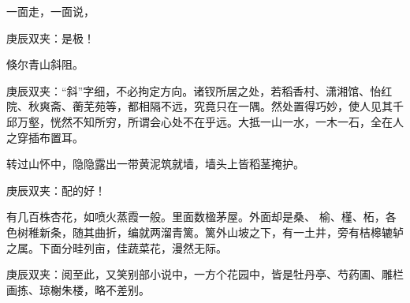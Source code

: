 \begin{parag}
    一面走，一面说，\begin{note}庚辰双夹：是极！\end{note}倏尔青山斜阻。\begin{note}庚辰双夹：“斜”字细，不必拘定方向。诸钗所居之处，若稻香村、潇湘馆、怡红院、秋爽斋、蘅芜苑等，都相隔不远，究竟只在一隅。然处置得巧妙，使人见其千邱万壑，恍然不知所穷，所谓会心处不在乎远。大抵一山一水，一木一石，全在人之穿插布置耳。\end{note}转过山怀中，隐隐露出一带黄泥筑就墙，墙头上皆稻茎掩护。\begin{note}庚辰双夹：配的好！\end{note}有几百株杏花，如喷火蒸霞一般。里面数楹茅屋。外面却是桑、 榆、槿、柘，各色树稚新条，随其曲折，编就两溜青篱。篱外山坡之下，有一土井，旁有桔槔辘轳之属。下面分畦列亩，佳蔬菜花，漫然无际。\begin{note}庚辰双夹：阅至此，又笑别部小说中，一方个花园中，皆是牡丹亭、芍药圃、雕栏画拣、琼榭朱楼，略不差别。\end{note}
\end{parag}


